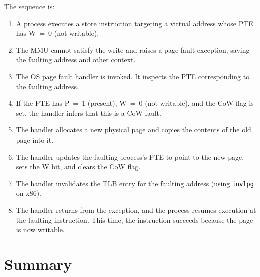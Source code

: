 \documentclass[11pt]{article}
\begin{document}
The sequence is:
\begin{enumerate}
    \item A process executes a store instruction targeting a virtual address whose PTE has W~=~0 (not writable).
    \item The MMU cannot satisfy the write and raises a page fault exception, saving the faulting address and other context.
    \item The OS page fault handler is invoked. It inspects the PTE corresponding to the faulting address.
    \item If the PTE has P~=~1 (present), W~=~0 (not writable), and the CoW flag is set, the handler infers that this is a CoW fault.
    \item The handler allocates a new physical page and copies the contents of the old page into it.
    \item The handler updates the faulting process's PTE to point to the new page, sets the W bit, and clears the CoW flag.
    \item The handler invalidates the TLB entry for the faulting address (using \texttt{invlpg} on x86).
    \item The handler returns from the exception, and the process resumes execution at the faulting instruction. This time, the instruction succeeds because the page is now writable.
\end{enumerate}

\section{Summary}
\end{document}
